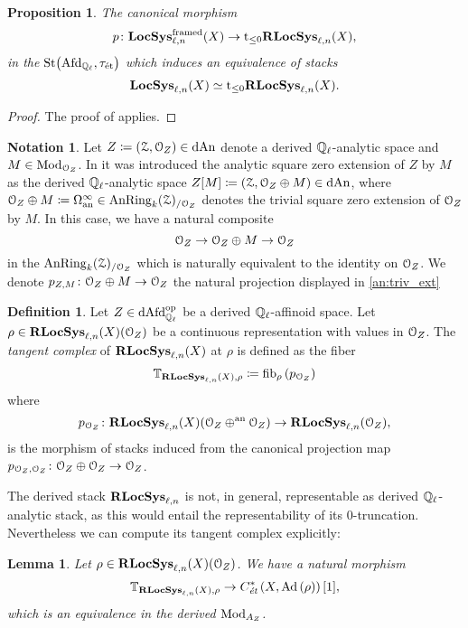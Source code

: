 \documentclass[10pt,a4paper]{amsart}
\numberwithin{equation}{subsection}
\theoremstyle{plain}
\newtheorem{lemma}[theorem]{Lemma}
\newtheorem{prop}[theorem]{Proposition}
\theoremstyle{definition}
\newtheorem{defi}[theorem]{Definition}
\newtheorem{notation}[theorem]{Notation}
\theoremstyle{remark}
\numberwithin{equation}{section}
\begin{document}
\begin{prop} \label{123}
The canonical morphism
	\[
		p \colon  \mathbf{LocSys}_{\ell, n}^{\mathrm{framed}}(X) \to  \mathrm t_{\leq 0} \mathbf R \mathbf{LocSys}_{\ell, n}(X) ,
	\]
in the \infcat $\mathrm{St} \big( \mathrm{Afd}_{\mathbb{Q}_\ell}, \tau_{\text{\'et}} \big)$ which induces an equivalence of stacks
	\[
		\mathbf{LocSys}_{\ell, n}(X) \simeq \mathrm{t}_{\leq 0} \mathbf R \mathbf{LocSys}_{\ell, n}(X).
	\]
\end{prop}

\begin{proof}
The proof of \cite[Theorem 4.5.8]{me1} applies.
\end{proof}


\begin{notation}
Let $Z \coloneqq (\mathcal Z, \mathcal{O}_Z) \in \mathrm{dAn}$ denote a derived $\mathbb Q_\ell$-analytic space and $M \in \mathrm{Mod}_{\mathcal{O}_Z}$. In \cite[\S 5]{porta_rep} it was introduced the analytic square zero extension of $Z$ by $M$ as the derived $\mathbb Q_\ell$-analytic space $Z[M] \coloneqq
(\mathcal Z, \mathcal{O}_Z \oplus M) \in \mathrm{dAn}$, where $\mathcal{O}_Z \oplus M \coloneqq \Omega^\infty_{\mathrm{an}} \in \mathrm{AnRing}_k(\mathcal Z)_{/ \mathcal{O}_Z}$ denotes the trivial square zero extension of $\mathcal{O}_Z$ by $M$. In this case, we have a natural composite
	\begin{equation} \label{an:triv_ext}
		\mathcal{O}_Z \to \mathcal{O}_Z \oplus M \to \mathcal{O}_Z
	\end{equation}
in the \infcat $\mathrm{AnRing}_k(\mathcal Z)_{/ \mathcal{O}_Z}$ which is naturally equivalent to the identity on $\mathcal{O}_Z$. We denote $p_{Z, M} \colon \mathcal{O}_Z \oplus M \to \mathcal{O}_Z$ the natural projection displayed in \eqref{an:triv_ext}
\end{notation}

\begin{defi} \label{tangent}
Let $Z \in \mathrm{dAfd}_{\mathbb{Q}_\ell}^{\mathrm{op}}$ be a derived $\mathbb{Q}_\ell$-affinoid space. Let $\rho \in \mathbf R \mathbf{LocSys}_{\ell, n}(X)(\mathcal{O}_Z)$ be a continuous representation with values in $\mathcal{O}_Z$.
The \emph{tangent complex} of $\mathbf R \mathbf{LocSys}_{\ell, n}(X)$ at $\rho$ is defined as the fiber
	\[
		\mathbb T_{\mathbf R \mathbf{LocSys}_{\ell, n}(X), \rho} \coloneqq \mathrm{fib}_{\rho} \left( p_{\mathcal{O}_Z} \right)
	\]
where 
	\[ 
		p_{\mathcal{O}_Z} \colon \mathbf R \mathbf{LocSys}_{\ell, n}(X) ( \mathcal{O}_Z \oplus^{\mathrm{an}} \mathcal{O}_Z) \to \mathbf R \mathbf{LocSys}_{\ell, n}(\mathcal{O}_Z), 
	\]
is the morphism of stacks
induced from the canonical projection map $p_{\mathcal{O}_Z, \mathcal{O}_Z} \colon \mathcal{O}_Z \oplus \mathcal{O}_Z \to \mathcal{O}_Z$.
\end{defi}

The derived stack $ \mathbf R \mathbf{LocSys}_{\ell, n}$ is not, in general, representable as derived $\mathbb{Q}_\ell$-analytic stack, as this would entail the representability of its $0$-truncation. Nevertheless we can compute its tangent
complex explicitly:

\begin{lemma}{\cite[Proposition 4.4.9.]{me1}}
Let $\rho \in \mathbf R \mathbf{LocSys}_{\ell, n}(X)(\mathcal{O}_Z)$. We have a natural morphism
	\[
		\mathbb{T}_{ \mathbf R \mathbf{LocSys}_{\ell, n}(X), \rho} \to C^*_{\emph{\text{\'et}}}\left(X, \mathrm{Ad} \left( \rho \right) \right)[1] , 
	\]
which is an equivalence in the derived \infcat $\mathrm{Mod}_{A_Z}$.
\end{lemma}
\end{document}
